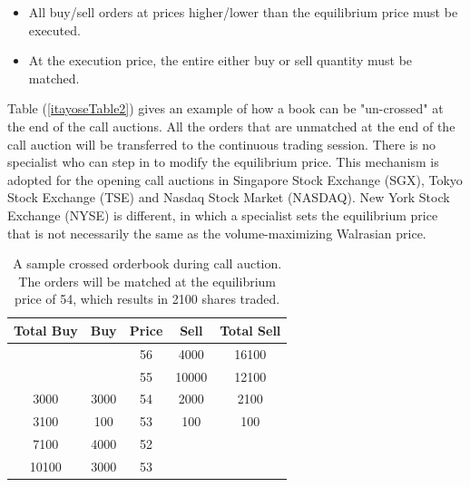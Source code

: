 \documentclass{article}
\begin{document}
\begin{itemize}
  \item All buy/sell orders at prices higher/lower than the equilibrium price must be executed.
  \item At the execution price, the entire either buy or sell quantity must be matched.
\end{itemize}

Table (\ref{itayoseTable2}) gives an example of how a book can be "un-crossed" at the end of the call auctions. All the orders that are unmatched at the end of the call auction will be transferred to the continuous trading session. There is no specialist who can step in to modify the equilibrium price. This mechanism is adopted for the opening call auctions in Singapore Stock Exchange (SGX), Tokyo Stock Exchange (TSE) and Nasdaq Stock Market (NASDAQ). New York Stock Exchange (NYSE) is different, in which a specialist sets the equilibrium price that is not necessarily the same as the volume-maximizing Walrasian price.

\begin{table}[]
  \centering
  \begin{tabular}{c|c|c|c|c}
    \hline
    \textbf{Total Buy} & \textbf{Buy} & \textbf{Price} & \textbf{Sell} & \textbf{Total Sell} \\ \hline
                       &              & 56             & 4000          & 16100               \\ \hline
                       &              & 55             & 10000         & 12100               \\ \hline
    3000               & 3000         & 54             & 2000          & 2100                \\ \hline
    3100               & 100          & 53             & 100           & 100                 \\ \hline
    7100               & 4000         & 52             &               &                     \\ \hline
    10100              & 3000         & 53             &               &                     \\ \hline
  \end{tabular}

  \caption{A sample crossed orderbook during call auction. The orders will be matched at the equilibrium price of 54, which results in 2100 shares traded.}
  \label{itayoseTable1}
\end{table}
\end{document}
